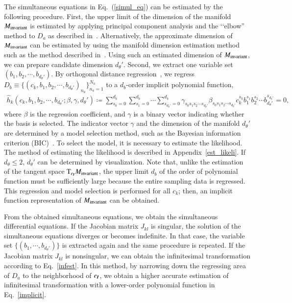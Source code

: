 \documentclass[preprint,
bibnotes,
 amsmath,amssymb,
 aps,
]{revtex4-1}
\begin{document}
The simultaneous equations in Eq.~(\ref{simul_eq}) can be estimated by the following procedure. 
First, the upper limit of the dimension of the manifold $M_{{\rm invariant}}$ is estimated by applying principal component analysis and the ‘‘elbow'' method to $D_a$ as described in~\cite{ulfarsson2008dimension}. 
Alternatively, the approximate dimension of $M_{{\rm invariant}}$ can be estimated by using the manifold dimension estimation method such as the method described in~\cite{levina2005maximum}. 
Using such an estimated dimension of $M_{{\rm invariant}}$, we can prepare candidate dimension $d_{\theta}'$. 
Second, we extract one variable set $(b_1,b_2,\cdots,b_{d_{\theta}'})$. 
By orthogonal distance regression~\cite{brown1990statistical}, we regress $D_b \equiv \{(c_{k},b_1,b_2,\cdots,b_{d_{\theta}'})_{n_a}\}_{n_a=1}^{N_a}$ to a $d_b$-order implicit polynomial function, 
\begin{eqnarray}
\label{implicit}
\hat{h}_k(c_k, b_1,b_2,\cdots,b_{d_{\theta}'};\beta,\gamma,d_{\theta}') \coloneqq 
\sum_{s_0=0}^{d_b}\sum_{s_1=0}^{d_b}  \cdots \sum_{s_{d_{\theta}'}=0}^{d_b} \gamma_{s_0s_1s_2\cdots s_{d_{\theta}'}} \beta_{s_0s_1s_2\cdots s_{d_{\theta}'}}c_k^{s_0} b_{1}^{s_1}b_{2}^{s_2}\cdots b_{d_{\theta}'}^{s_{d_{\theta}'}}=0, 
\end{eqnarray}
where $\beta$ is the regression coefficient, and $\gamma$ is a binary vector indicating whether the basis is selected. 
The indicator vector $\gamma$ and the dimension of the manifold $d_{\theta}'$ are determined by a model selection method, such as the Bayesian information criterion (BIC)~\cite{schwarz1978estimating}. To select the model, it is necessary to estimate the likelihood. The method of estimating the likelihood is described in Appendix~\ref{est_likeli}. 
If $d_{\theta}\leq 2$, $d_{\theta}'$ can be determined by visualization. 
Note that, unlike the estimation of the tangent space ${\rm T}_{e_{\textit{\textbf{I}}}} M_{{\rm invariant}}$, the upper limit $d_b$ of the order of polynomial function must be sufficiently large because the entire sampling data is regressed. 
This regression and model selection is performed for all $c_k$; then, an implicit function representation of $M_{\rm invariant}$ can be obtained. 
\par
From the obtained simultaneous equations, we obtain the simultaneous differential equations. 
If the Jacobian matrix $J_{kl}$ is singular, the solution of the simultaneous equations diverges or becomes indefinite. 
In that case, the variable set $\{(b_1, \cdots, b_{d_{\theta}'}) \} $ is extracted again and the same procedure is repeated. 
If the Jacobian matrix $J_{kl}$ is nonsingular, we can obtain the infinitesimal transformation according to Eq.~\eqref{infest}. 
In this method, by narrowing down the regressing area of $D_a$ to the neighborhood of $e_{\textit{\textbf{I}}}$, we obtain a higher accurate estimation of infinitesimal transformation with a lower-order polynomial function in Eq.~\eqref{implicit}.
\end{document}
